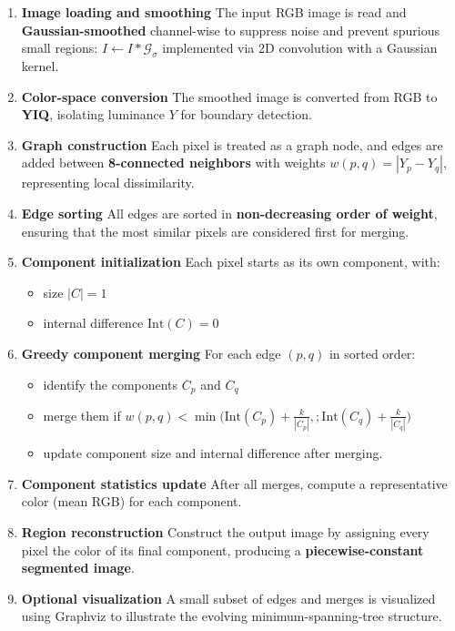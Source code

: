 \documentclass[11pt]{article}
\providecommand{\tightlist}{%
      \setlength{\itemsep}{0pt}\setlength{\parskip}{0pt}}
\begin{document}
\begin{enumerate}
\def\labelenumi{\arabic{enumi}.}
\item
  \textbf{Image loading and smoothing} The input RGB image is read and
  \textbf{Gaussian-smoothed} channel-wise to suppress noise and prevent
  spurious small regions: \(I \leftarrow I * \mathcal{G}_{\sigma}\)
  implemented via 2D convolution with a Gaussian kernel.
\item
  \textbf{Color-space conversion} The smoothed image is converted from
  RGB to \textbf{YIQ}, isolating luminance \(Y\) for boundary detection.
\item
  \textbf{Graph construction} Each pixel is treated as a graph node, and
  edges are added between \textbf{8-connected neighbors} with weights
  \(w(p,q) = |Y_p - Y_q|\), representing local dissimilarity.
\item
  \textbf{Edge sorting} All edges are sorted in \textbf{non-decreasing
  order of weight}, ensuring that the most similar pixels are considered
  first for merging.
\item
  \textbf{Component initialization} Each pixel starts as its own
  component, with:

  \begin{itemize}
  \tightlist
  \item
    size \(|C| = 1\)
  \item
    internal difference \(\mathrm{Int}(C) = 0\)
  \end{itemize}
\item
  \textbf{Greedy component merging} For each edge \((p,q)\) in sorted
  order:

  \begin{itemize}
  \tightlist
  \item
    identify the components \(C_p\) and \(C_q\)
  \item
    merge them if
    \(w(p,q) < \min\big(\mathrm{Int}(C_p) + \tfrac{k}{|C_p|},; \mathrm{Int}(C_q) + \tfrac{k}{|C_q|}\big)\)\\
  \item
    update component size and internal difference after merging.
  \end{itemize}
\item
  \textbf{Component statistics update} After all merges, compute a
  representative color (mean RGB) for each component.
\item
  \textbf{Region reconstruction} Construct the output image by assigning
  every pixel the color of its final component, producing a
  \textbf{piecewise-constant segmented image}.
\item
  \textbf{Optional visualization} A small subset of edges and merges is
  visualized using Graphviz to illustrate the evolving
  minimum-spanning-tree structure.
\end{enumerate}
\end{document}
